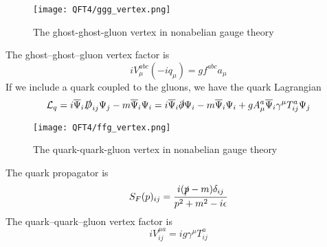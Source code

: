 \begin{figure}[!h]
	\centering
	\texttt{[image: QFT4/ggg\_vertex.png]}
	\caption{The ghost-ghost-gluon vertex in nonabelian gauge theory}
\end{figure}

\noindent
The ghost–ghost–gluon vertex factor is
\[iV^{abc}_{\mu}(-iq_{\mu}) = gf^{abc}a_{\mu}\]
If we include a quark coupled to the gluons, we have the quark Lagrangian
\[\mathcal{L}_{q} = i\overline{\Psi}_{i}\slashed{D}_{ij}\Psi_{j} - m\overline{\Psi}_{i}\Psi_{i} = i\overline{\Psi}_{i}\slashed{\partial}\Psi_{i} - m\overline{\Psi}_{i}\Psi_{i} + gA^a_{\mu}\overline{\Psi}_{i} \gamma^{\mu} T^a_{ij} \Psi_j \]

\begin{figure}[!h]
	\centering
	\texttt{[image: QFT4/ffg\_vertex.png]}
	\caption{The quark-quark-gluon vertex in nonabelian gauge theory}
\end{figure}

\noindent
The quark propagator is
\[S_F(p)_{ij} = \frac{i(\slashed{p}-m)\delta_{ij}}{p^2+m^2 - i\epsilon}\]
The quark–quark–gluon vertex factor is
\[iV^{\mu a}_{ij} =  ig\gamma^{\mu}T^a_{ij}\]

